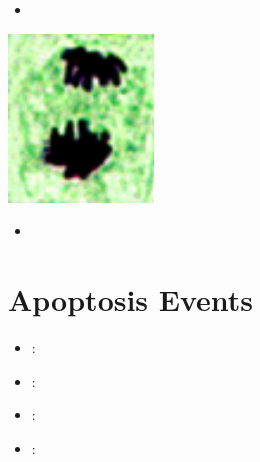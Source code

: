   \begin{itemize}
    \item 
  \end{itemize}
  \begin{center}
    \includegraphics[scale=0.5]{images/week-1-mp5.png}
  \end{center}
  \begin{itemize}
    \item 
  \end{itemize}

  
\section{Apoptosis Events}\label{Apoptosis Events}
\begin{itemize}
  \item {}:
  \item {}:
  \item {}:
  \item {}:
\end{itemize}

